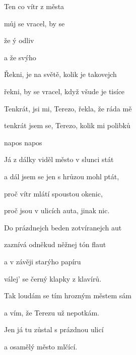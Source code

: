 

\zs
Ten  co vítr  z města 

můj  se vracel,  by se 

že ý  odliv 

a  že svýho  
\ks

\zr
Řekni,  je na světě, kolik je takovejch 

řekni,  by se vracel, když všude je tisíce 

Tenkrát,  jsi mi, Terezo, řekla, že ráda mě 

tenkrát  jsem se, Terezo, kolik mi polibků 

napos napos
\kr

\zs
Já z dálky viděl město v slunci stát

a dál jsem se jen s hrůzou mohl ptát,

proč vítr mlátí spoustou okenic,

proč jsou v ulicích auta, jinak nic.
\ks

\zr  \kr

\zs
Do prázdnejch beden zotvíranejch aut

zaznívá odněkud něžnej tón flaut

a v závěji starýho papíru

válej' se černý klapky z klavírů.
\ks

\zr  \kr

\zs
Tak loudám se tím hrozným městem sám

a vím, že Terezu už nepotkám.

Jen já tu zůstal s prázdnou ulicí

a osamělý město mlčící.
\ks

\zr  \kr

\kp

